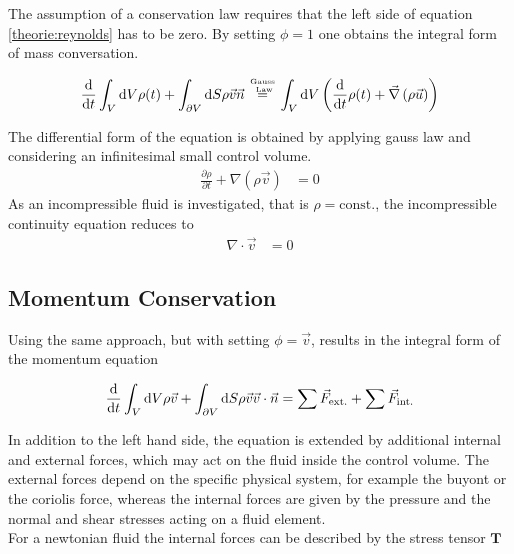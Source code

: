 The assumption of a conservation law requires that the left side of equation \ref{theorie:reynolds} has to be zero.
By setting $\phi = 1$ one obtains the integral form of mass conversation.

\begin{align}
    \frac{\mathop{}\!\mathrm{d}}{\mathop{}\!\mathrm{d} t} \int_V \mathop{}\!\mathrm{d} V \rho(t) + \int_{\partial V}\mathop{}\!\mathrm{d} S \rho \vec{v}\vec{n}
     \stackrel{\text{Gauss} \atop \text{ Law}}{=}
    \int_V \mathop{}\!\mathrm{d} V \left( \frac{\mathop{}\!\mathrm{d}}{\mathop{}\!\mathrm{d} t} \rho(t) + \vec{\nabla}\left(\rho \vec{u}\right)\right)
\end{align}

The differential form of the equation is obtained by applying gauss law and considering an infinitesimal small control volume.
\begin{align}
     \frac{\partial \rho}{\partial t}  + \nabla \left(\rho \vec{v}\right) &= 0
\end{align}
As an incompressible fluid is investigated, that is $\rho = \text{const.}$, the incompressible continuity equation reduces to
\begin{align}
     \nabla \cdot \vec{v} &= 0
\end{align}

\subsection{Momentum Conservation}

Using the same approach, but with setting $\phi = \vec{v}$, results in the integral form of the momentum equation

\begin{align}
    \label{theorie:intimpulse}
    \frac{\mathop{}\!\mathrm{d}}{\mathop{}\!\mathrm{d} t} \int_V \mathop{}\!\mathrm{d} V \rho \vec{v} + \int_{\partial V} \mathop{}\!\mathrm{d} S \rho\vec{v}\vec{v}\cdot \vec{n}  =  \sum \vec{F}_{\text{ext.}} + \sum \vec{F}_{\text{int.}}
\end{align}

In addition to the left hand side, the equation is extended by additional internal and external forces, which may act on the fluid inside the control volume.
The external forces depend on the specific physical system, for example the buyont or the coriolis force, whereas the internal forces
are given by the pressure and the normal and shear stresses acting on a fluid element.\\
For a newtonian fluid the internal forces can be described by the stress tensor $\bm{T}$


